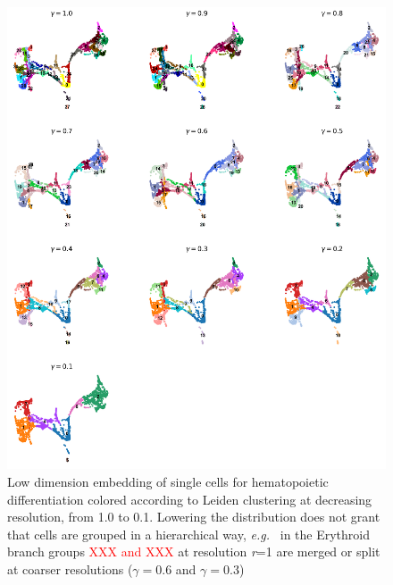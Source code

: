 \documentclass[11pt, titlepage, twoside]{article}
\begin{document}
\begin{figure}[htbp]
\centering
\includegraphics[keepaspectratio,width=\textwidth,height=0.75\textheight]{Figure_Paul15_Leiden_r.png}
\caption[]{Low dimension embedding of single cells for hematopoietic differentiation colored according to Leiden clustering at decreasing resolution, from 1.0 to 0.1. Lowering the distribution does not grant that cells are grouped in a hierarchical way, \emph{e.g.\ } in the Erythroid branch groups \textcolor{red}{XXX and XXX} at resolution \emph{r}=1 are merged or split at coarser resolutions ($\gamma=0.6$ and $\gamma=0.3$)}\label{Figure_Paul15_Leiden_r}
\end{figure}
\end{document}
